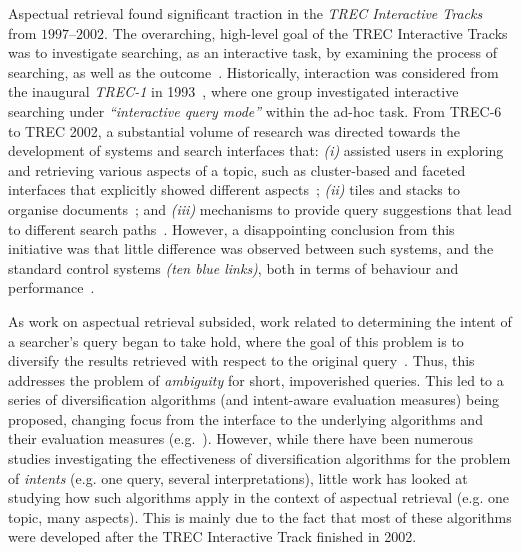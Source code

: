 Aspectual retrieval found significant traction in the \textit{TREC Interactive Tracks} from $1997$--$2002$. The overarching, high-level goal of the TREC Interactive Tracks was to investigate searching, as an interactive task, by examining the process of searching, as well as the outcome~\cite{over2001trec}. Historically, interaction was considered from the inaugural \emph{TREC-1} in 1993~\cite{harman1993trec1}, where one group investigated interactive searching under \emph{``interactive query mode''} within the ad-hoc task. From TREC-6 to TREC 2002, a substantial volume of research was directed towards the development of systems and search interfaces that: \emph{(i)} assisted users in exploring and retrieving various aspects of a topic, such as cluster-based and faceted interfaces that explicitly showed different aspects~\cite{villa2009aspect_interface, mcdonald1998interactive}; \emph{(ii)} tiles and stacks to organise documents~\cite{hearst1995tilebars, hearst1997texttiling, harper2006piling, iwata2012tilediversified}; and \emph{(iii)} mechanisms to provide query suggestions that lead to different search paths~\cite{umemoto2016scentbar, kato2012query_suggestion}. However, a disappointing conclusion from this initiative was that little difference was observed between such systems, and the standard control systems \emph{(ten blue links)}, both in terms of behaviour and performance~\cite{voorhees05trec}.

As work on aspectual retrieval subsided, work related to determining the intent of a searcher's query began to take hold, where the goal of this problem is to diversify the results retrieved with respect to the original query~\cite{rose2004understanding_user_goals}. Thus, this addresses the problem of \emph{ambiguity} for short, impoverished queries. This led to a series of diversification algorithms (and intent-aware evaluation measures) being proposed, changing focus from the interface to the underlying algorithms and their evaluation measures (e.g.~\cite{santos2010query_reformulations_diversification, santos2011intent, carbonell1998mmr, zuccon2009qprp, agrawal2009diversification, radlinski2006diversification, he2011diversification_clustering, carterette2009probabalistic, chen2006lessismore, zhai2015subtopics}). However, while there have been numerous studies investigating the effectiveness of diversification algorithms for the problem of \emph{intents} (e.g. one query, several interpretations), little work has looked at studying how such algorithms apply in the context of aspectual retrieval (e.g. one topic, many aspects). This is mainly due to the fact that most of these algorithms were developed after the TREC Interactive Track finished in 2002.

